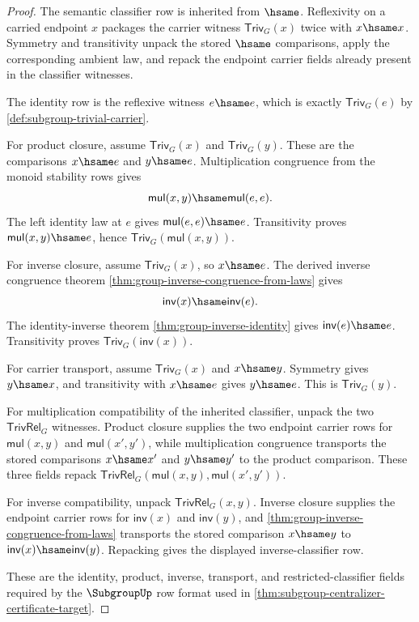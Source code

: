 \begin{proof}
The semantic classifier row is inherited from $\hsame$. Reflexivity on a carried endpoint $x$ packages the carrier witness $\mathsf{Triv}_G(x)$ twice with $x\hsame x$. Symmetry and transitivity unpack the stored $\hsame$ comparisons, apply the corresponding ambient law, and repack the endpoint carrier fields already present in the classifier witnesses.

The identity row is the reflexive witness $e\hsame e$, which is exactly $\mathsf{Triv}_G(e)$ by \autoref{def:subgroup-trivial-carrier}.

For product closure, assume $\mathsf{Triv}_G(x)$ and $\mathsf{Triv}_G(y)$. These are the comparisons $x\hsame e$ and $y\hsame e$. Multiplication congruence from the monoid stability rows gives
$$
\mathsf{mul}(x,y)\hsame\mathsf{mul}(e,e).
$$
The left identity law at $e$ gives $\mathsf{mul}(e,e)\hsame e$. Transitivity proves $\mathsf{mul}(x,y)\hsame e$, hence $\mathsf{Triv}_G(\mathsf{mul}(x,y))$.

For inverse closure, assume $\mathsf{Triv}_G(x)$, so $x\hsame e$. The derived inverse congruence theorem \autoref{thm:group-inverse-congruence-from-laws} gives
$$
\mathsf{inv}(x)\hsame\mathsf{inv}(e).
$$
The identity-inverse theorem \autoref{thm:group-inverse-identity} gives $\mathsf{inv}(e)\hsame e$. Transitivity proves $\mathsf{Triv}_G(\mathsf{inv}(x))$.

For carrier transport, assume $\mathsf{Triv}_G(x)$ and $x\hsame y$. Symmetry gives $y\hsame x$, and transitivity with $x\hsame e$ gives $y\hsame e$. This is $\mathsf{Triv}_G(y)$.

For multiplication compatibility of the inherited classifier, unpack the two $\mathsf{TrivRel}_G$ witnesses. Product closure supplies the two endpoint carrier rows for $\mathsf{mul}(x,y)$ and $\mathsf{mul}(x',y')$, while multiplication congruence transports the stored comparisons $x\hsame x'$ and $y\hsame y'$ to the product comparison. These three fields repack $\mathsf{TrivRel}_G(\mathsf{mul}(x,y),\mathsf{mul}(x',y'))$.

For inverse compatibility, unpack $\mathsf{TrivRel}_G(x,y)$. Inverse closure supplies the endpoint carrier rows for $\mathsf{inv}(x)$ and $\mathsf{inv}(y)$, and \autoref{thm:group-inverse-congruence-from-laws} transports the stored comparison $x\hsame y$ to $\mathsf{inv}(x)\hsame\mathsf{inv}(y)$. Repacking gives the displayed inverse-classifier row.

These are the identity, product, inverse, transport, and restricted-classifier fields required by the $\SubgroupUp$ row format used in \autoref{thm:subgroup-centralizer-certificate-target}.
\end{proof}

